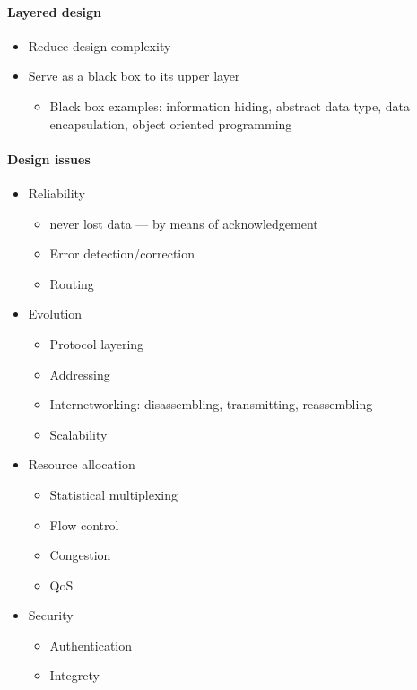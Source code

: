 \paragraph{Layered design}

\begin{itemize}
\item Reduce design complexity
\item Serve as a black box to its upper layer
  \begin{itemize}
  \item Black box examples: information hiding, abstract data type, data encapsulation,
    object oriented programming
  \end{itemize}
\end{itemize}
  
\paragraph{Design issues}

\begin{itemize}
\item Reliability
  \begin{itemize}
  \item never lost data --- by means of acknowledgement
  \item Error detection/correction
  \item Routing
  \end{itemize}
\item Evolution
  \begin{itemize}
  \item Protocol layering
  \item Addressing
  \item Internetworking: disassembling, transmitting, reassembling
  \item Scalability
  \end{itemize}
\item Resource allocation
  \begin{itemize}
  \item Statistical multiplexing
  \item Flow control
  \item Congestion
  \item QoS
  \end{itemize}
\item Security
  \begin{itemize}
  \item Authentication
  \item Integrety
  \end{itemize}
\end{itemize}

